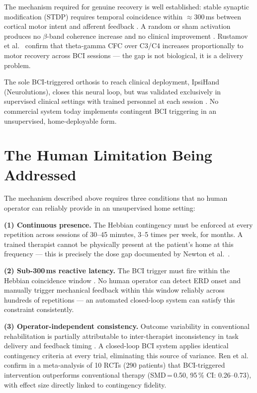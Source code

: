 \documentclass[11pt,a4paper]{article}
\begin{document}
The mechanism required for genuine recovery is well established: stable 
synaptic modification (STDP) requires temporal coincidence within 
$\approx$300\,ms between cortical motor intent and afferent 
feedback \cite{biasiucci2018brain, krueger2024hebbian}. A random or sham 
activation produces no $\beta$-band coherence 
increase \cite{krueger2024hebbian} and no clinical 
improvement \cite{kim2025efficacy}. Rustamov et al.~\cite{rustamov2025ipsihand} 
confirm that theta-gamma CFC over C3/C4 increases proportionally to motor 
recovery across BCI sessions --- the gap is not biological, it is a 
delivery problem.

The sole BCI-triggered orthosis to reach clinical deployment, IpsiHand 
(Neurolutions), closes this neural loop, but 
was validated exclusively in supervised clinical settings with trained 
personnel at each session \cite{rustamov2025ipsihand}. No commercial 
system today implements contingent BCI triggering in an unsupervised, 
home-deployable form.

\section{The Human Limitation Being Addressed}

The mechanism described above requires three conditions that no human 
operator can reliably provide in an unsupervised home setting:

\textbf{(1) Continuous presence.} The Hebbian contingency must be enforced 
at every repetition across sessions of 30--45 minutes, 3--5 times per week, 
for months. A trained therapist cannot be physically present at the 
patient's home at this frequency — this is precisely the dose gap 
documented by Newton et al.~\cite{newton2023dose}.

\textbf{(2) Sub-300\,ms reactive latency.} The BCI trigger must fire 
within the Hebbian coincidence window \cite{krueger2024hebbian}. No human operator can detect ERD onset and manually trigger 
mechanical feedback within this window reliably across hundreds 
of repetitions — an automated closed-loop system can satisfy this constraint consistently.

\textbf{(3) Operator-independent consistency.} Outcome variability in 
conventional rehabilitation is partially attributable to inter-therapist 
inconsistency in task delivery and feedback timing \cite{newton2023dose}. 
A closed-loop BCI system applies identical contingency criteria at every 
trial, eliminating this source of variance. Ren et al.~\cite{ren2024effect} 
confirm in a meta-analysis of 10 RCTs (290 patients) that BCI-triggered 
intervention outperforms conventional therapy (SMD\,=\,0.50, 95\,\% CI: 
0.26--0.73), with effect size directly linked to contingency fidelity.
\end{document}
